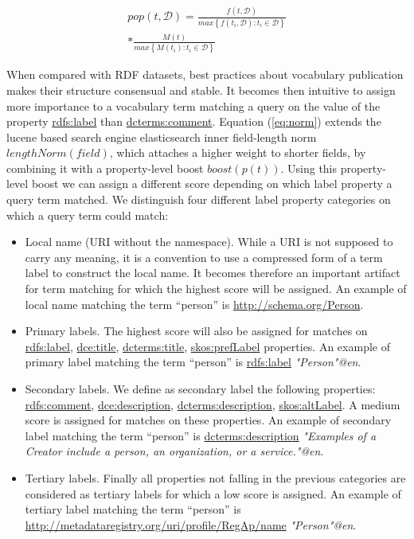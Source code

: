 \documentclass{iosart2c}
\begin{document}
\begin{equation}\label{eq:pop}
\begin{split}
pop(t,\mathcal{D}) = \frac{f(t,\mathcal{D})}{max\left\{f(t_i,\mathcal{D}): t_i \in \mathcal{D}\right\}} \\
* \frac{M(t)}{max\left\{M(t_i): t_i \in \mathcal{D}\right\}}
\end{split}
\end{equation}

When compared with RDF datasets, best practices about vocabulary publication makes their structure consensual and stable. It becomes then intuitive to assign more importance to a vocabulary term matching a query on the value of the property \url{rdfs:label} than \url{dcterms:comment}. Equation (\ref{eq:norm}) extends the lucene based search engine elasticsearch inner field-length norm $lengthNorm(field)$, which attaches a higher weight to shorter fields, by combining it with a property-level boost $boost(p(t))$. Using this property-level boost we can assign a different score depending on which label property a query term matched. We distinguish four different label property categories on which a query term could match: 
		\begin{itemize}
 			\item Local name (URI without the namespace). While a URI is not supposed to carry any meaning, it is a convention to use a compressed form of a term label to construct the local name. It becomes therefore an important artifact for term matching for which the highest score will be assigned. An example of local name matching the term ``person'' is \url{http://schema.org/Person}.
			\item Primary labels. The highest score will also be assigned for matches on \url{rdfs:label}, \url{dce:title}, \url{dcterms:title}, \url{skos:prefLabel} properties. An example of primary label matching the term ``person'' is \url{rdfs:label} \emph{"Person"@en}.
			\item Secondary labels. We define as secondary label the following properties: \url{rdfs:comment}, \url{dce:description}, \url{dcterms:description}, \url{skos:altLabel}. A medium score is assigned for matches on these properties. An example of secondary label matching the term ``person'' is \url{dcterms:description} \emph{"Examples of a Creator include a person, an organization, or a service."@en}.
			\item Tertiary labels. Finally all properties not falling in the previous categories are considered as tertiary labels for which a low score is assigned. An example of tertiary label matching the term ``person'' is \url{http://metadataregistry.org/uri/profile/RegAp/name} \emph{"Person"@en}. 
		\end{itemize}
\end{document}
